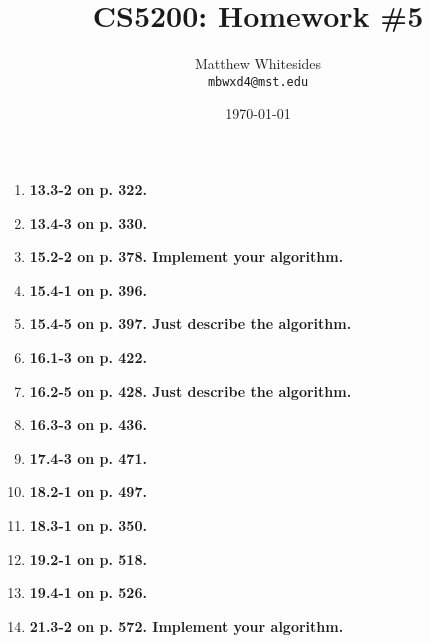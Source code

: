 \documentclass{article}
\title{CS5200: Homework \#5} %
\author{Matthew Whitesides\\ \texttt{mbwxd4@mst.edu}} %
\date{\today} %
\begin{document}
  \maketitle %
 
  \begin{enumerate}
    \item \textbf{13.3-2 on p. 322.}
    \item \textbf{13.4-3 on p. 330.}
    \item \textbf{15.2-2 on p. 378. Implement your algorithm.}
    \item \textbf{15.4-1 on p. 396.}
    \item \textbf{15.4-5 on p. 397. Just describe the algorithm.}
    \item \textbf{16.1-3 on p. 422.}
    \item \textbf{16.2-5 on p. 428. Just describe the algorithm.}
    \item \textbf{16.3-3 on p. 436.}
    \item \textbf{17.4-3 on p. 471.}
    \item \textbf{18.2-1 on p. 497.}
    \item \textbf{18.3-1 on p. 350.}
    \item \textbf{19.2-1 on p. 518.}
    \item \textbf{19.4-1 on p. 526.}
    \item \textbf{21.3-2 on p. 572. Implement your algorithm.}
  \end{enumerate}
\end{document}
